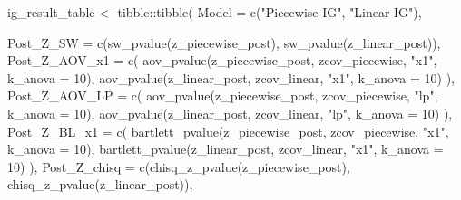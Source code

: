 \documentclass[
  english,
  letterpaper,
  DIV=11,
  numbers=noendperiod]{scrartcl}
\newenvironment{Shaded}{\begin{snugshade}}{\end{snugshade}}
\newcommand{\AttributeTok}[1]{\textcolor[rgb]{0.40,0.45,0.13}{#1}}
\newcommand{\DecValTok}[1]{\textcolor[rgb]{0.68,0.00,0.00}{#1}}
\newcommand{\FunctionTok}[1]{\textcolor[rgb]{0.28,0.35,0.67}{#1}}
\newcommand{\NormalTok}[1]{\textcolor[rgb]{0.00,0.23,0.31}{#1}}
\newcommand{\OtherTok}[1]{\textcolor[rgb]{0.00,0.23,0.31}{#1}}
\newcommand{\SpecialCharTok}[1]{\textcolor[rgb]{0.37,0.37,0.37}{#1}}
\newcommand{\StringTok}[1]{\textcolor[rgb]{0.13,0.47,0.30}{#1}}
\begin{document}
\begin{Shaded}
\begin{Highlighting}[]
\NormalTok{ig\_result\_table }\OtherTok{\textless{}{-}}\NormalTok{ tibble}\SpecialCharTok{::}\FunctionTok{tibble}\NormalTok{(}
  \AttributeTok{Model =} \FunctionTok{c}\NormalTok{(}\StringTok{"Piecewise IG"}\NormalTok{, }\StringTok{"Linear IG"}\NormalTok{),}

  \AttributeTok{Post\_Z\_SW =} \FunctionTok{c}\NormalTok{(}\FunctionTok{sw\_pvalue}\NormalTok{(z\_piecewise\_post), }\FunctionTok{sw\_pvalue}\NormalTok{(z\_linear\_post)),}
  \AttributeTok{Post\_Z\_AOV\_x1 =} \FunctionTok{c}\NormalTok{(}
    \FunctionTok{aov\_pvalue}\NormalTok{(z\_piecewise\_post, zcov\_piecewise, }\StringTok{"x1"}\NormalTok{, }\AttributeTok{k\_anova =} \DecValTok{10}\NormalTok{),}
    \FunctionTok{aov\_pvalue}\NormalTok{(z\_linear\_post,    zcov\_linear,    }\StringTok{"x1"}\NormalTok{, }\AttributeTok{k\_anova =} \DecValTok{10}\NormalTok{)}
\NormalTok{  ),}
  \AttributeTok{Post\_Z\_AOV\_LP =} \FunctionTok{c}\NormalTok{(}
    \FunctionTok{aov\_pvalue}\NormalTok{(z\_piecewise\_post, zcov\_piecewise, }\StringTok{"lp"}\NormalTok{, }\AttributeTok{k\_anova =} \DecValTok{10}\NormalTok{),}
    \FunctionTok{aov\_pvalue}\NormalTok{(z\_linear\_post,    zcov\_linear,    }\StringTok{"lp"}\NormalTok{, }\AttributeTok{k\_anova =} \DecValTok{10}\NormalTok{)}
\NormalTok{  ),}
  \AttributeTok{Post\_Z\_BL\_x1 =} \FunctionTok{c}\NormalTok{(}
    \FunctionTok{bartlett\_pvalue}\NormalTok{(z\_piecewise\_post, zcov\_piecewise, }\StringTok{"x1"}\NormalTok{, }\AttributeTok{k\_anova =} \DecValTok{10}\NormalTok{),}
    \FunctionTok{bartlett\_pvalue}\NormalTok{(z\_linear\_post,    zcov\_linear,    }\StringTok{"x1"}\NormalTok{, }\AttributeTok{k\_anova =} \DecValTok{10}\NormalTok{)}
\NormalTok{  ),}
  \AttributeTok{Post\_Z\_chisq =} \FunctionTok{c}\NormalTok{(}\FunctionTok{chisq\_z\_pvalue}\NormalTok{(z\_piecewise\_post), }\FunctionTok{chisq\_z\_pvalue}\NormalTok{(z\_linear\_post)),}


\end{Highlighting}
\end{Shaded}
\end{document}
